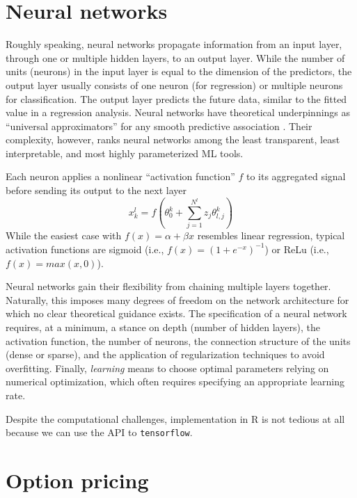 \documentclass[
]{krantz}
\begin{document}
\hypertarget{neural-networks}{%
\section{Neural networks}\label{neural-networks}}

Roughly speaking, neural networks propagate information from an input layer, through one or multiple hidden layers, to an output layer. While the number of units (neurons) in the input layer is equal to the dimension of the predictors, the output layer usually consists of one neuron (for regression) or multiple neurons for classification. The output layer predicts the future data, similar to the fitted value in a regression analysis. Neural networks have theoretical underpinnings as ``universal approximators'' for any smooth predictive association \citep{Hornik1991}. Their complexity, however, ranks neural networks among the least transparent, least interpretable, and most highly parameterized ML tools.

Each neuron applies a nonlinear ``activation function'' \(f\) to its aggregated signal before
sending its output to the next layer
\[x_k^l = f\left(\theta^k_{0} + \sum\limits_{j = 1}^{N ^l}z_j\theta_{l,j}^k\right)\]
While the easiest case with \(f(x) = \alpha + \beta x\) resembles linear regression, typical activation functions are sigmoid (i.e., \(f(x) = (1+e^{-x})^{-1}\)) or ReLu (i.e., \(f(x) = max(x, 0)\)).

Neural networks gain their flexibility from chaining multiple layers together. Naturally, this imposes many degrees of freedom on the network architecture for which no clear theoretical guidance exists. The specification of a neural network requires, at a minimum, a stance on depth (number of hidden layers), the activation function, the number of neurons, the connection structure of the units (dense or sparse), and the application of regularization techniques to avoid overfitting. Finally, \emph{learning} means to choose optimal parameters relying on numerical optimization, which often requires specifying an appropriate learning rate.

Despite the computational challenges, implementation in R is not tedious at all because we can use the API to \texttt{tensorflow}.

\hypertarget{option-pricing}{%
\section{Option pricing}\label{option-pricing}}
\end{document}

